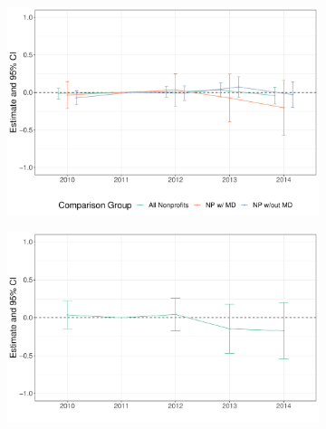 \documentclass[12pt]{article}
\begin{document}
\begin{figure}[ht!]
\begin{subfigure}[b]{0.45\textwidth}
         \includegraphics[width=\textwidth]{Objects/mort_forprofit_es_graph.pdf}
         \label{fig:es_plotc}
     \end{subfigure}
     \hfill
     \begin{subfigure}[b]{0.45\textwidth}
         \centering
         \caption{}
         \includegraphics[width=\textwidth]{Objects/mort_MD_es_graph.pdf}
         \label{fig:es_plotd}
     \end{subfigure}
        \label{fig:es_plot}
    \end{figure}







    

    

    

    

    

    

	
	
	
\end{document}
